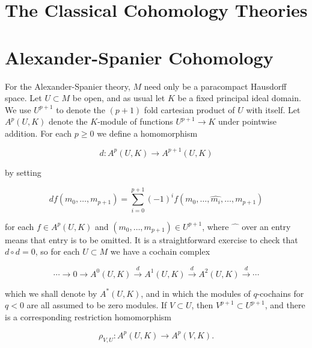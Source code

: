 \section{The Classical Cohomology Theories}


\section{Alexander-Spanier Cohomology}


\label{thm:5.26} For the Alexander-Spanier theory, $M$ need only be a paracompact Hausdorff space. Let $U \subset M$ be open, and as usual let $K$ be a fixed principal ideal domain. We use $U^{p+1}$ to denote the $(p+1)$ fold cartesian product of $U$ with itself. Let $A^p(U,K)$ denote the $K$-module of functions $U^{p+1} \to K$ under pointwise addition. For each $p \geq 0$ we define a homomorphism 

\begin{equation}
\tag{1}\label{eq:5.26:1}
d\colon A^{p}(U,K)\to A^{p+1}(U,K)
\end{equation}

by setting

\begin{equation}
\tag{2}\label{eq:5.26:2}
df(m_{0},\ldots,m_{p+1})=\sum_{i=0}^{p+1}(-1)^{i}f(m_{0},\ldots,\widehat{m_{i}},\ldots,m_{p+1})
\end{equation}

for each $f \in A^p(U,K)$ and $(m_0, \ldots, m_{p+1}) \in U^{p+1}$, where $\widehat{\phantom{m}}$ over an entry means that entry is to be omitted. It is a straightforward exercise to check that $d \circ d = 0$, so for each $U \subset M$ we have a cochain complex

\begin{equation}
\tag{3}\label{eq:5.26:3}
\cdots\to0\to A^{0}(U,K)\xrightarrow{d}A^{1}(U,K)\xrightarrow{d}A^{2}(U,K)\xrightarrow{d}\cdots
\end{equation}

which we shall denote by $A^{*}(U,K)$, and in which the modules of $q$-cochains for $q<0$ are all assumed to be zero modules. If $V\subset U$, then $V^{p+1}\subset U^{p+1}$, and there is a corresponding restriction homomorphism

\begin{equation}
\tag{4}\label{eq:5.26:4}
\rho_{V,U}\colon A^{p}(U,K)\to A^{p}(V,K).
\end{equation}

